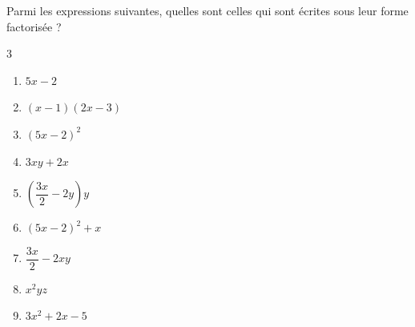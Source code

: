 %
%
    Parmi les expressions suivantes, quelles sont celles qui sont écrites sous leur forme factorisée ?
    \begin{multicols}{3}
        \begin{enumerate}
            \item \(5x-2\)
            \item \((x-1)(2x-3)\)
            \item \((5x-2)^2\)
            \item \(3xy+2x\)
            \item \(\left(\dfrac{3x}{2}-2y\right)y\)
            \item \((5x-2)^2+x\)
            \item \(\dfrac{3x}{2}-2xy\)
            \item \(x^2yz\)
            \item \(3x^2+2x-5\)
        \end{enumerate}
    \end{multicols}

